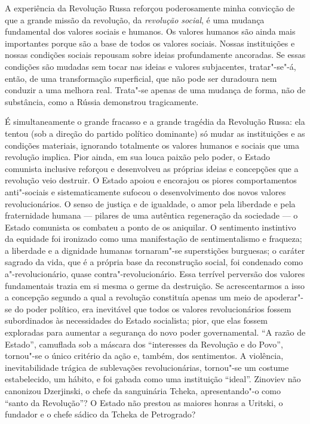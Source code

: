A experiência da Revolução Russa reforçou poderosamente minha convicção
de que a grande missão da revolução, da \textit{revolução social}, é uma mudança
fundamental dos valores sociais e humanos. Os valores humanos são ainda
mais importantes porque são a base de todos os valores sociais. Nossas
instituições e nossas condições sociais repousam sobre ideias
profundamente ancoradas. Se essas condições são mudadas sem tocar nas
ideias e valores subjacentes, tratar"-se"-á, então, de uma
transformação superficial, que não pode ser duradoura nem conduzir a uma
melhora real. Trata"-se apenas de uma mudança de forma, não de
substância, como a Rússia demonstrou tragicamente.

É simultaneamente o grande fracasso e a grande tragédia da Revolução
Russa: ela tentou (sob a direção do partido político dominante) só
mudar as instituições e as condições materiais, ignorando totalmente os
valores humanos e sociais que uma revolução implica. Pior ainda, em sua
louca paixão pelo poder, o Estado comunista inclusive reforçou e
desenvolveu as próprias ideias e concepções que a revolução veio
destruir. O Estado apoiou e encorajou os piores comportamentos
anti"-sociais e sistematicamente sufocou o desenvolvimento dos novos
valores revolucionários. O senso de justiça e de igualdade, o amor pela
liberdade e pela fraternidade humana --- pilares de uma autêntica
regeneração da sociedade --- o Estado comunista os combateu a ponto de
os aniquilar. O sentimento instintivo da equidade foi ironizado como
uma manifestação de sentimentalismo e fraqueza; a liberdade e a
dignidade humanas tornaram"-se superstições burguesas; o caráter
sagrado da vida, que é a própria base da reconstrução social, foi
condenado como a"-revolucionário, quase contra"-revolucionário. Essa
terrível perversão dos valores fundamentais trazia em si mesma o germe
da destruição. Se acrescentarmos a isso a concepção segundo a qual a
revolução constituía apenas um meio de apoderar"-se do poder político,
era inevitável que todos os valores revolucionários fossem subordinados
às necessidades do Estado socialista; pior, que elas fossem exploradas
para aumentar a segurança do novo poder governamental. “A razão de
Estado”, camuflada sob a máscara dos “interesses da Revolução e do
Povo”, tornou"-se o único critério da ação e, também, dos
sentimentos. A violência, inevitabilidade trágica de sublevações
revolucionárias, tornou"-se um costume estabelecido, um hábito, e foi
gabada como uma instituição “ideal”. Zinoviev não canonizou Dzerjinski,
o chefe da sanguinária Tcheka, apresentando"-o como “santo da
Revolução”? O Estado não prestou as maiores honras a Uritski, o
fundador e o chefe sádico da Tcheka de Petrogrado?

